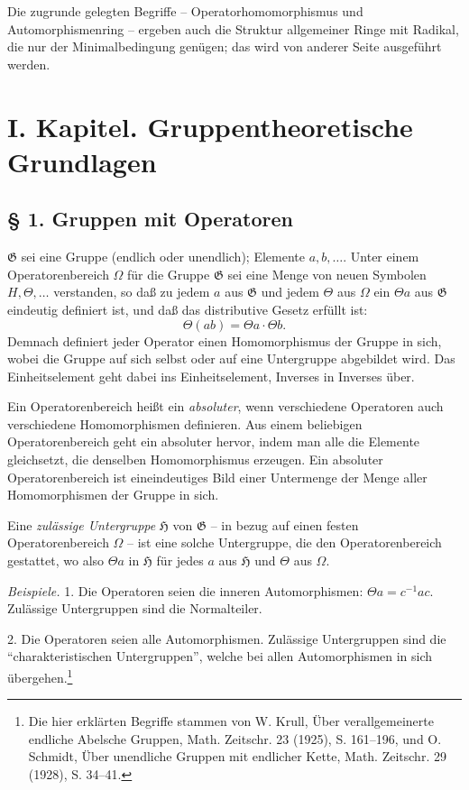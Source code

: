 \documentclass[11pt]{article}
\providecommand{\mG}{\mathfrak{G}}
\providecommand{\mH}{\mathfrak{H}}
\begin{document}
Die zugrunde gelegten Begriffe -- Operatorhomomorphismus und Automorphismenring -- ergeben auch die Struktur allgemeiner Ringe mit Radikal, die nur der Minimalbedingung genügen; das wird von anderer Seite ausgeführt werden.

\section*{I. Kapitel. Gruppentheoretische Grundlagen}

\subsection*{§ 1. Gruppen mit Operatoren}

$\mG$ sei eine Gruppe (endlich oder unendlich); Elemente $a,b,\ldots$. Unter einem Operatorenbereich $\Omega$ für die Gruppe $\mG$ sei eine Menge von neuen Symbolen $H,\Theta,\ldots$ verstanden, so daß zu jedem $a$ aus $\mG$ und jedem $\Theta$ aus $\Omega$ ein $\Theta a$ aus $\mG$ eindeutig definiert ist, und daß das distributive Gesetz erfüllt ist:
\[
        \Theta(ab)=\Theta a\cdot\Theta b.
\]
Demnach definiert jeder Operator einen Homomorphismus der Gruppe in sich, wobei die Gruppe auf sich selbst oder auf eine Untergruppe abgebildet wird. Das Einheitselement geht dabei ins Einheitselement, Inverses in Inverses über.

Ein Operatorenbereich heißt ein \emph{absoluter}, wenn verschiedene Operatoren auch verschiedene Homomorphismen definieren. Aus einem beliebigen Operatorenbereich geht ein absoluter hervor, indem man alle die Elemente gleichsetzt, die denselben Homomorphismus erzeugen. Ein absoluter Operatorenbereich ist eineindeutiges Bild einer Untermenge der Menge aller Homomorphismen der Gruppe in sich.

Eine \emph{zulässige Untergruppe} $\mH$ von $\mG$ -- in bezug auf einen festen Operatorenbereich $\Omega$ -- ist eine solche Untergruppe, die den Operatorenbereich gestattet, wo also $\Theta a$ in $\mH$ für jedes $a$ aus $\mH$ und $\Theta$ aus $\Omega$.

\emph{Beispiele.} 1. Die Operatoren seien die inneren Automorphismen: $\Theta a=c^{-1}ac$. Zulässige Untergruppen sind die Normalteiler.

2. Die Operatoren seien alle Automorphismen. Zulässige Untergruppen sind die ``charakteristischen Untergruppen'', welche bei allen Automorphismen in sich übergehen.\footnote{Die hier erklärten Begriffe stammen von W. Krull, Über verallgemeinerte endliche Abelsche Gruppen, Math. Zeitschr. 23 (1925), S. 161--196, und O. Schmidt, Über unendliche Gruppen mit endlicher Kette, Math. Zeitschr. 29 (1928), S. 34--41.}
\end{document}
